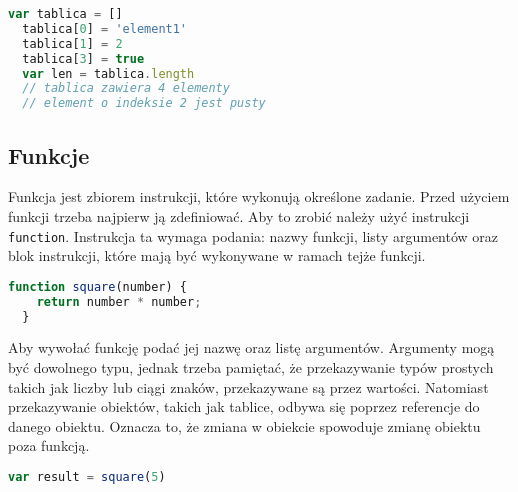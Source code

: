 \begin{lstlisting}[language=JavaScript, caption=Przykład przypisania elementów o różnych typach , label=alg:array5]
  var tablica = []
  tablica[0] = 'element1'
  tablica[1] = 2
  tablica[3] = true
  var len = tablica.length 
  // tablica zawiera 4 elementy
  // element o indeksie 2 jest pusty
\end{lstlisting}

\subsection{Funkcje}

\par Funkcja jest zbiorem instrukcji, które wykonują określone zadanie. Przed użyciem funkcji trzeba najpierw ją zdefiniować. Aby to zrobić należy użyć instrukcji \texttt{function}. Instrukcja ta wymaga podania: nazwy funkcji, listy argumentów oraz blok instrukcji, które mają być wykonywane w ramach tejże funkcji.

\begin{lstlisting}[language=JavaScript, caption=Przykład deklaracji funkcji, label=alg:function1]
  function square(number) {
    return number * number;
  }
\end{lstlisting}

\par Aby wywołać funkcję podać jej nazwę oraz listę argumentów. Argumenty mogą być dowolnego typu, jednak trzeba pamiętać, że przekazywanie typów prostych takich jak liczby lub ciągi znaków, przekazywane są przez wartości. Natomiast przekazywanie obiektów, takich jak tablice, odbywa się poprzez referencje do danego obiektu. Oznacza to, że zmiana w obiekcie spowoduje zmianę obiektu poza funkcją.

\begin{lstlisting}[language=JavaScript, caption=Przykład uzycia funkcji, label=alg:function2]
  var result = square(5)
\end{lstlisting}

